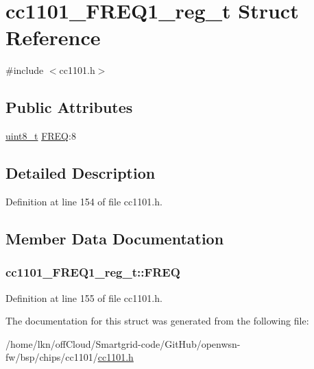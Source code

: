 \hypertarget{structcc1101___f_r_e_q1__reg__t}{}\section{cc1101\+\_\+\+F\+R\+E\+Q1\+\_\+reg\+\_\+t Struct Reference}
\label{structcc1101___f_r_e_q1__reg__t}


{\ttfamily \#include $<$cc1101.\+h$>$}

\subsection*{Public Attributes}
\begin{DoxyCompactItemize}
\item 
\hyperlink{_p_e___types_8h_aba7bc1797add20fe3efdf37ced1182c5}{uint8\+\_\+t} \hyperlink{structcc1101___f_r_e_q1__reg__t_a59e2f2221e35b77e91acdebfabb4d3de}{F\+R\+EQ}\+:8
\end{DoxyCompactItemize}


\subsection{Detailed Description}


Definition at line 154 of file cc1101.\+h.



\subsection{Member Data Documentation}
\subsubsection[{\texorpdfstring{F\+R\+EQ}{FREQ}}]{ cc1101\+\_\+\+F\+R\+E\+Q1\+\_\+reg\+\_\+t\+::\+F\+R\+EQ}\hypertarget{structcc1101___f_r_e_q1__reg__t_a59e2f2221e35b77e91acdebfabb4d3de}{}\label{structcc1101___f_r_e_q1__reg__t_a59e2f2221e35b77e91acdebfabb4d3de}


Definition at line 155 of file cc1101.\+h.



The documentation for this struct was generated from the following file\+:\begin{DoxyCompactItemize}
\item 
/home/lkn/off\+Cloud/\+Smartgrid-\/code/\+Git\+Hub/openwsn-\/fw/bsp/chips/cc1101/\hyperlink{cc1101_8h}{cc1101.\+h}\end{DoxyCompactItemize}
